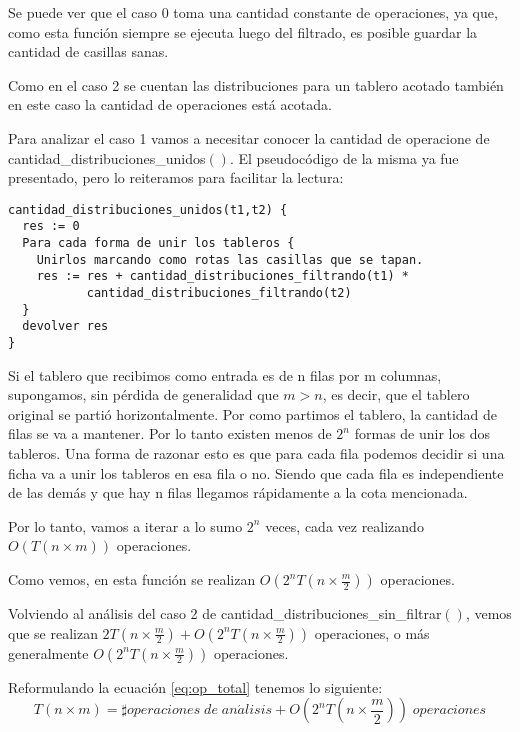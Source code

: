 \documentclass[a4paper, 12pt] {article}
\begin{document}
Se puede ver que el caso 0 toma una cantidad constante de operaciones, ya que, como esta funci\'on siempre se ejecuta luego del filtrado, es posible guardar la cantidad de casillas sanas. 

Como en el caso 2 se cuentan las distribuciones para un tablero acotado tambi\'en en este caso la cantidad de operaciones est\'a acotada.

Para analizar el caso 1 vamos a necesitar conocer la cantidad de operacione de cantidad\_distribuciones\_unidos$\left( \right) $.
El pseudoc\'odigo de la misma ya fue presentado, pero lo reiteramos para facilitar la lectura:

\begin{verbatim}
cantidad_distribuciones_unidos(t1,t2) {
  res := 0
  Para cada forma de unir los tableros {
    Unirlos marcando como rotas las casillas que se tapan.
    res := res + cantidad_distribuciones_filtrando(t1) * 
           cantidad_distribuciones_filtrando(t2)
  }
  devolver res
}
\end{verbatim}


Si el tablero que recibimos como entrada es de n filas por m columnas, supongamos, sin p\'erdida de generalidad que $m > n$, es decir, que el tablero original se parti\'o horizontalmente. Por como partimos el tablero, la cantidad de filas se va a mantener. Por lo tanto existen menos de $2^{n}$ formas de unir los dos tableros. Una forma de razonar esto es que para cada fila podemos decidir si una ficha va a unir los tableros en esa fila o no. Siendo que cada fila es independiente de las dem\'as y que hay n filas llegamos r\'apidamente a la cota mencionada.

Por lo tanto, vamos a iterar a lo sumo $2^{n}$ veces, cada vez realizando $ O\left( T\left( n \times m\right) \right) $ operaciones.

Como vemos, en esta funci\'on se realizan $O\left( 2^{n} T\left( n \times\frac{m}{2}\right) \right) $ operaciones.

Volviendo al an\'alisis del caso 2 de cantidad\_distribuciones\_sin\_filtrar$\left( \right) $, vemos que se realizan $2T\left( n \times \frac{m}{2}\right) + O\left( 2^{n} T\left( n \times \frac{m}{2}\right) \right)$ operaciones, o m\'as generalmente $O\left( 2^{n} T\left( n \times \frac{m}{2}\right) \right)$ operaciones.

Reformulando la ecuaci\'on \ref{eq:op_total} tenemos lo siguiente:
\begin{equation}
 T\left( n \times m\right) = \sharp operaciones\; de\; an\acute{a}lisis + O\left( 2^{n} T\left( n \times \frac{m}{2}\right) \right) \; operaciones 
\end{equation}
\end{document}
